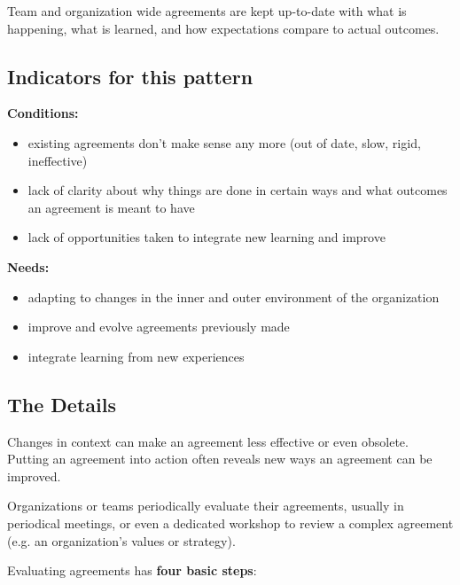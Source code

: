 Team and organization wide agreements are kept up-to-date with what is happening, what is learned, and how expectations compare to actual outcomes.

\subsection{Indicators for this pattern}
\label{indicatorsforthispattern}

\textbf{Conditions:}

\begin{itemize}
\item existing agreements don't make sense any more (out of date, slow, rigid, ineffective)

\item lack of clarity about why things are done in certain ways and what outcomes an agreement is meant to have

\item lack of opportunities taken to integrate new learning and improve

\end{itemize}

\textbf{Needs:}

\begin{itemize}
\item adapting to changes in the inner and outer environment of the organization

\item improve and evolve agreements previously made

\item integrate learning from new experiences

\end{itemize}

\subsection{The Details}
\label{thedetails}

Changes in context can make an agreement less effective or even obsolete. Putting an agreement into action often reveals new ways an agreement can be improved.

Organizations or teams periodically evaluate their agreements, usually in periodical meetings, or even a dedicated workshop to review a complex agreement (e.g. an organization's values or strategy).

Evaluating agreements has \textbf{four basic steps}:


